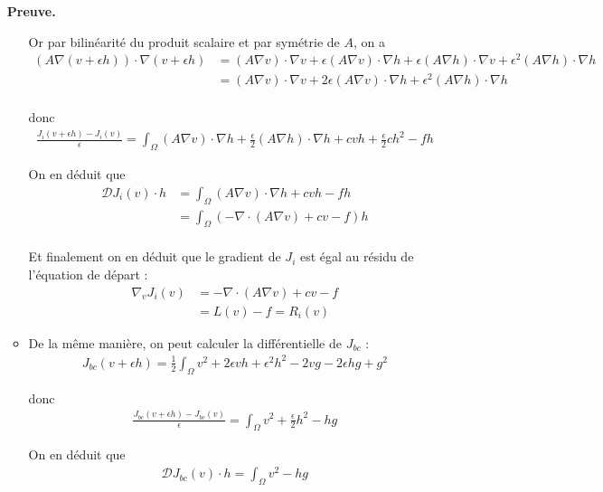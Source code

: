 \documentclass[french]{article}
\newenvironment{preuve}[1][]{\begin{tcolorbox}[
	colback=white, %
	colframe=green!70!black, %
	arc=2mm, %
	boxrule=1pt, %
	breakable, enhanced jigsaw
	]
	\textcolor{green!70!black}{\textbf{Preuve.} \\}

	#1
}{\end{tcolorbox}}
\begin{document}
\begin{itemize}[label=]
\begin{preuve}
\begin{itemize}[label=\textbullet]
				Or par bilinéarité du produit scalaire et par symétrie de $A$, on a
				\begin{align*}
					(A\nabla(v+\epsilon h)) \cdot \nabla(v+\epsilon h) &= (A\nabla v) \cdot \nabla v + \epsilon (A\nabla v) \cdot \nabla h + \epsilon (A\nabla h) \cdot \nabla v + \epsilon^2 (A\nabla h) \cdot \nabla h \\
					&= (A\nabla v) \cdot \nabla v + 2\epsilon (A\nabla v) \cdot \nabla h + \epsilon^2 (A\nabla h) \cdot \nabla h \\
				\end{align*}
	
				donc
				\begin{align*}
					\frac{J_i(v+\epsilon h)-J_i(v)}{\epsilon} = \int_{\Omega} (A\nabla v) \cdot \nabla h + \frac{\epsilon}{2} (A\nabla h) \cdot \nabla h + cvh+ \frac{\epsilon}{2}ch^2 - fh
				\end{align*}
	
				On en déduit que
				\begin{align*}
					\mathcal{D}J_i(v)\cdot h &= \int_{\Omega} (A\nabla v) \cdot \nabla h + cvh - fh \\
					&= \int_{\Omega} (-\nabla\cdot(A\nabla v) + cv - f)h \\
				\end{align*}
	
				Et finalement on en déduit que le gradient de $J_i$ est égal au résidu de l'équation de départ :
				\begin{align*}
					\nabla_v J_i(v) &= -\nabla\cdot(A\nabla v) + cv - f \\
					&= L(v) - f = R_i(v)
				\end{align*}
			
				\item De la même manière, on peut calculer la différentielle de $J_{bc}$ :
				\begin{align*}
					J_{bc}(v+\epsilon h)=\frac{1}{2} \int_{\Omega} v^2+2\epsilon vh +\epsilon^2 h^2 - 2vg - 2\epsilon hg+g^2
				\end{align*}

				donc
				\begin{align*}
					\frac{J_{bc}(v+\epsilon h)-J_{bc}(v)}{\epsilon} = \int_{\Omega} v^2+\frac{\epsilon}{2} h^2 - hg
				\end{align*}
				
				On en déduit que
				\begin{align*}
					\mathcal{D}J_{bc}(v)\cdot h = \int_{\Omega} v^2 - hg
				\end{align*}
				

\end{itemize}
\end{preuve}
\end{itemize}
\end{document}
